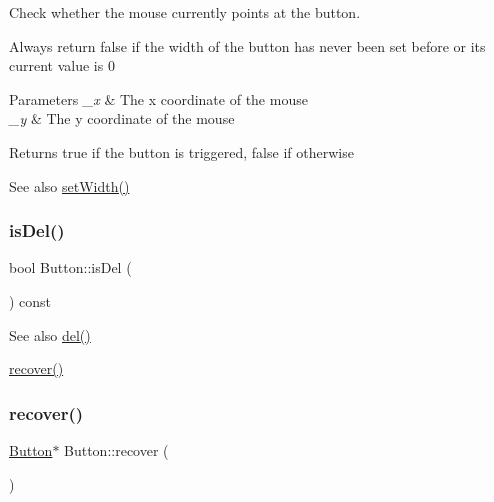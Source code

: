 Check whether the mouse currently points at the button. 

Always return false if the width of the button has never been set before or its current value is 0 
\begin{DoxyParams}{Parameters}
{\em \+\_\+x} & The x coordinate of the mouse \\
\hline
{\em \+\_\+y} & The y coordinate of the mouse \\
\hline
\end{DoxyParams}
\begin{DoxyReturn}{Returns}
true if the button is triggered, false if otherwise 
\end{DoxyReturn}
\begin{DoxySeeAlso}{See also}
\mbox{\hyperlink{class_button_a0ffdc53b6e8abd2de78cdd2ab40d2d69}{set\+Width()}} 
\end{DoxySeeAlso}
\mbox{\label{class_button_a8926913ae57165ae3ee4b1496509895e}} 
\subsubsection{\texorpdfstring{is\+Del()}{isDel()}}
{\footnotesize\ttfamily bool Button\+::is\+Del (\begin{DoxyParamCaption}{ }\end{DoxyParamCaption}) const\hspace{0.3cm}{\ttfamily [inline]}}

\begin{DoxySeeAlso}{See also}
\mbox{\hyperlink{class_button_a83d4a76946aa8896173c010e5846f74c}{del()}} 

\mbox{\hyperlink{class_button_a769460b65574008ad93b2a7a9bbc0673}{recover()}} 
\end{DoxySeeAlso}
\mbox{\label{class_button_a769460b65574008ad93b2a7a9bbc0673}} 
\subsubsection{\texorpdfstring{recover()}{recover()}}
{\footnotesize\ttfamily \mbox{\hyperlink{class_button}{Button}}$\ast$ Button\+::recover (\begin{DoxyParamCaption}{ }\end{DoxyParamCaption})\hspace{0.3cm}{\ttfamily [inline]}}

